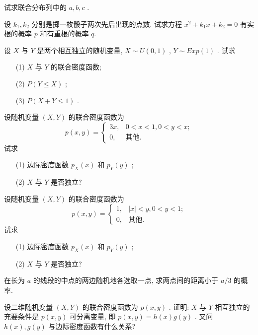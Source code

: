 \begin{xiti}
   	    试求联合分布列中的 $a,b,c$ .
   		\item 设 $k_1,k_2$ 分别是掷一枚骰子两次先后出现的点数. 试求方程 $x^2+k_1x+k_2=0$ 有实根的概率 $p$ 和有重根的概率 $q$.
   		\item 设 $X$ 与 $Y$ 是两个相互独立的随机变量, $X\sim U(0,1)$ , $Y\sim Exp(1)$ . 试求
   		\begin{itemize}
   			\item[(1)] $X$ 与 $Y$ 的联合密度函数;
   			\item[(2)] $P(Y\leqslant X)$ ;
   			\item[(3)] $P(X+Y\leqslant1)$ .
   		\end{itemize}
   	    \item 设随机变量 $(X,Y)$ 的联合密度函数为
   	    \begin{equation*}
   	    	p(x,y)=\begin{cases}
   	    	3x, & 0<x<1,0<y<x;\\
   	    	0, & \text{其他}.
   	    	\end{cases}
   	    \end{equation*}
   	    试求
   	    \begin{itemize}
   	    	\item[(1)] 边际密度函数 $p_{X}(x)$ 和 $p_{Y}(y)$ ;
   	    	\item[(2)] $X$ 与 $Y$ 是否独立?
   	    \end{itemize}
       \item 设随机变量 $(X,Y)$ 的联合密度函数为
       \begin{equation*}
       	p(x,y)=\begin{cases}
       	1, & |x|<y,0<y<1;\\
       	0, & \text{其他}.
       	\end{cases}
       \end{equation*}
       试求
       \begin{itemize}
       	\item[(1)] 边际密度函数 $p_{X}(x)$ 和 $p_{Y}(y)$ ;
       	\item[(2)] $X$ 与 $Y$ 是否独立?
       \end{itemize}
       \item 在长为 $a$ 的线段的中点的两边随机地各选取一点, 求两点间的距离小于 $a/3$ 的概率.
       \item 设二维随机变量 $(X,Y)$ 的联合密度函数为 $p(x,y)$ . 证明: $X$ 与 $Y$ 相互独立的充要条件是 $p(x,y)$ 可分离变量, 即 $p(x,y)=h(x)g(y)$ . 又问 $h(x),g(y)$ 与边际密度函数有什么关系?
   \end{xiti}

